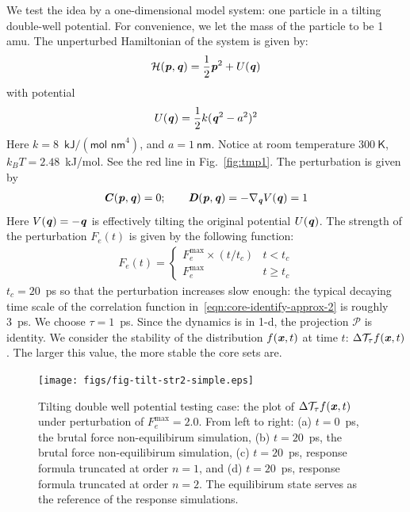 \documentclass[aip,jcp,a4paper,reprint,onecolumn]{revtex4-1}
\newcommand{\vect}[1]{\textbf{\textit{#1}}}
\newcommand{\mh}{\mathcal H}
\newcommand{\mt}{\mathcal T}
\begin{document}
We test the idea by a one-dimensional model system: one particle in a
tilting double-well potential. For convenience, we let the mass of the
particle to be 1 \textsf{amu}. The unperturbed
Hamiltonian of the system is given by:
\begin{align}
  \mh (\vect p, \vect q) = \frac 12 \vect p^2 + U(\vect q) 
\end{align}
with potential
\begin{align}
  U(\vect q) = \frac12 k (\vect q^2 - a^2)^2
\end{align}
Here $k = 8$~$\textsf{kJ} / (\textsf{mol nm}^4)$, and $ a = 1\ \textsf{nm}$.
Notice at room temperature $300\ \textsf{K}$, $k_BT = 2.48$~\textsf{kJ/mol}.
See the red line in Fig.~\ref{fig:tmp1}.
The perturbation is given by
\begin{align}
  \vect C(\vect p, \vect q) = 0; \qquad
  \vect D(\vect p, \vect q) = -\nabla_{\vect q} V(\vect q) = 1
\end{align}
Here $V(\vect q) = -\vect q$ is  effectively tilting the original
potential $U(\vect q)$. The strength of the perturbation $F_e(t)$ is given
by the following function:
\begin{align}
  F_e(t) = 
  \begin{cases}
    F_e^{\textrm{max}}\times (t / t_c) & t < t_c \\
    F_e^{\textrm{max}} & t \geq t_c
  \end{cases}
\end{align}
$t_c = 20$~\textsf{ps} so that the perturbation increases slow
enough: the typical decaying time scale of the correlation function
in~\eqref{eqn:core-identify-approx-2} is roughly 3~\textsf{ps}.
We choose $\tau = 1$~\textsf{ps}.
Since the dynamics is in
1-d, the projection $\mathcal P$ is identity.  We consider the stability of the
distribution $f(\vect x, t)$ at time $t$: $\Delta\mt_\tau f(\vect x, t)$.
The larger
this value, the more stable the core sets are.

\begin{figure}
  \centering
  \texttt{[image: figs/fig-tilt-str2-simple.eps]}
  \caption{
    Tilting double well potential testing case:
    the plot of $\Delta\mt_\tau f(\vect x,t)$  under perturbation of
    $F_e^{\textrm{max}} = 2.0$.
    From left to right:
    (a) $t=0$~\textsf{ps},
    the brutal force non-equilibirum simulation,
    (b) $t=20$~\textsf{ps},
    the brutal force non-equilibirum simulation,
    (c) $t=20$~\textsf{ps},
    response formula truncated at order $n=1$,
    and
    (d) $t=20$~\textsf{ps},
    response formula truncated at order $n=2$.
    The equilibirum state serves as the reference of
    the response simulations.
  }
  \label{fig:new-tmp2}
\end{figure}
\end{document}
